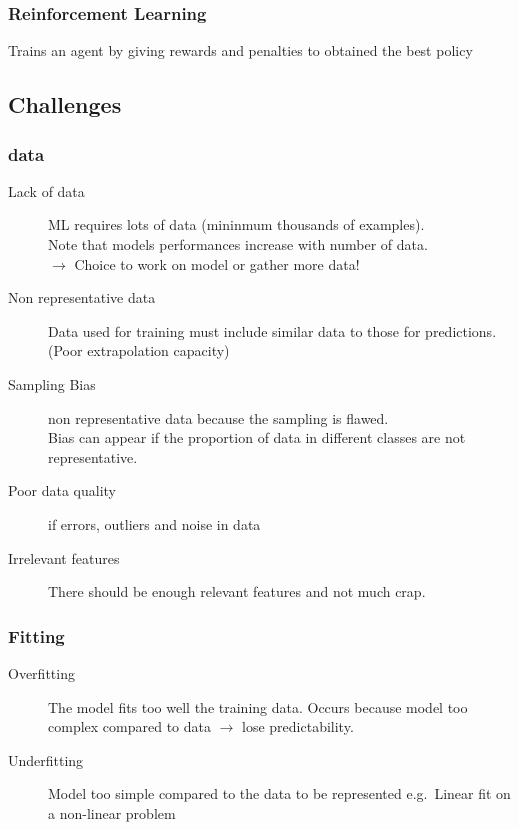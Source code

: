 \documentclass{article}
\begin{document}
\subsubsection{Reinforcement Learning}
Trains an agent by giving rewards and penalties to obtained the best policy

\subsection{Challenges}
\subsubsection{data}
\begin{description}
  \item[Lack of data] ML requires lots of data (mininmum thousands of examples).\\
                      Note that models performances increase with number of data.\\
                      $\rightarrow$ Choice to work on model or gather more data!

  \item[Non representative data] Data used for training must include similar data to those for predictions. (Poor extrapolation capacity)

  \item[Sampling Bias] non representative data because the sampling is flawed.\\
          Bias can appear if the proportion of data in different classes are not representative.

  \item[Poor data quality] if errors, outliers and noise in data

  \item[Irrelevant features] There should be enough relevant features and not much crap.
\end{description}


\subsubsection{Fitting}
\begin{description}
  \item[Overfitting] The model fits too well the training data. Occurs because model too complex compared to data $\rightarrow$ lose predictability.
  \item[Underfitting] Model too simple compared to the data to be represented e.g.\ Linear fit on a non-linear problem
\end{description}
\end{document}
